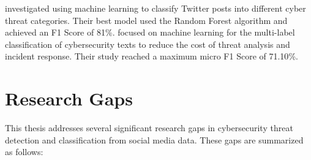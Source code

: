 \cite{hussein2023} investigated using machine learning to classify Twitter posts into different cyber threat categories. Their best model used the Random Forest algorithm and achieved an F1 Score of 81{\%}. \cite{masahiroetal2022} focused on machine learning for the multi-label classification of cybersecurity texts to reduce the cost of threat analysis and incident response. Their study reached a maximum micro F1 Score of 71.10{\%}.


\section{Research Gaps}\label{sec:research-gaps}
This thesis addresses several significant research gaps in cybersecurity threat detection and classification from social media data. These gaps are summarized as follows:

